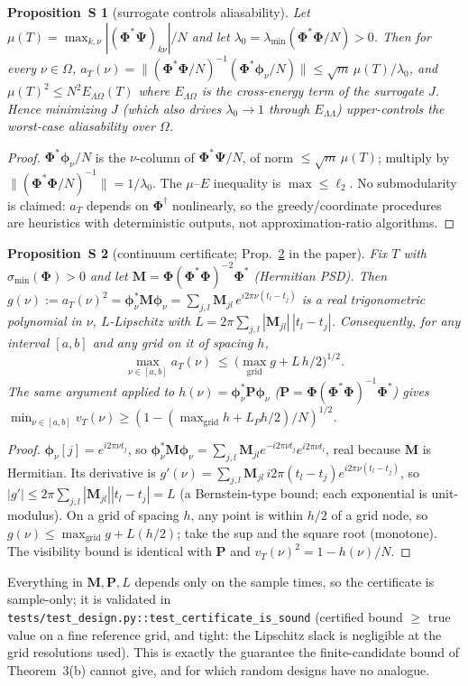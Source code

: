 \documentclass[10pt]{article}
\newtheorem{proposition}{Proposition~S}
\newcommand{\Phimat}{\bm{\Phi}}
\newcommand{\Psimat}{\bm{\Psi}}
\newcommand{\norm}[1]{\lVert#1\rVert}
\newcommand{\vt}{v_T}
\newcommand{\at}{a_T}
\begin{document}
\begin{proposition}[surrogate controls aliasability]
Let $\mu(T)=\max_{k,\nu}|(\Phimat^{*}\Psimat)_{k\nu}|/N$ and let $\lambda_0=\lambda_{\min}
(\Phimat^{*}\Phimat/N)>0$.  Then for every $\nu\in\Omega$,
$\at(\nu)=\norm{(\Phimat^{*}\Phimat/N)^{-1}(\Phimat^{*}\bm\phi_\nu/N)}\le
\sqrt m\,\mu(T)/\lambda_0$, and $\mu(T)^2\le N^2 E_{\Lambda\Omega}(T)$ where
$E_{\Lambda\Omega}$ is the cross-energy term of the surrogate $J$.  Hence minimizing $J$
(which also drives $\lambda_0\!\to\!1$ through $E_{\Lambda\Lambda}$) upper-controls the
worst-case aliasability over $\Omega$.
\end{proposition}
\begin{proof}
$\Phimat^{*}\bm\phi_\nu/N$ is the $\nu$-column of $\Phimat^{*}\Psimat/N$, of norm
$\le\sqrt m\,\mu(T)$; multiply by $\norm{(\Phimat^{*}\Phimat/N)^{-1}}=1/\lambda_0$.  The
$\mu$--$E$ inequality is $\max\le\ell_2$.  No submodularity is claimed: $\at$ depends on
$\Phimat^{\dagger}$ nonlinearly, so the greedy/coordinate procedures are heuristics with
deterministic outputs, not approximation-ratio algorithms.
\end{proof}

\begin{proposition}[continuum certificate; Prop.~\ref{prop:cert-num} in the paper]
\label{prop:cert-num}
Fix $T$ with $\sigma_{\min}(\Phimat)>0$ and let
$\bm M=\Phimat(\Phimat^{*}\Phimat)^{-2}\Phimat^{*}$ (Hermitian PSD).  Then
$g(\nu):=\at(\nu)^2=\bm\phi_\nu^{*}\bm M\bm\phi_\nu
=\sum_{j,l}\bm M_{jl}\,e^{i2\pi\nu(t_l-t_j)}$ is a real trigonometric polynomial in $\nu$,
$L$-Lipschitz with $L=2\pi\sum_{j,l}|\bm M_{jl}|\,|t_l-t_j|$.  Consequently, for any
interval $[a,b]$ and any grid on it of spacing $h$,
\[
\max_{\nu\in[a,b]}\at(\nu)\ \le\ \Big(\max_{\text{grid}} g+L\,h/2\Big)^{1/2}.
\]
The same argument applied to $h(\nu)=\bm\phi_\nu^{*}\bm P\bm\phi_\nu$
($\bm P=\Phimat(\Phimat^{*}\Phimat)^{-1}\Phimat^{*}$) gives
$\min_{\nu\in[a,b]}\vt(\nu)\ge(1-(\max_{\text{grid}}h+L_P h/2)/N)^{1/2}$.
\end{proposition}
\begin{proof}
$\bm\phi_\nu[j]=e^{i2\pi\nu t_j}$, so $\bm\phi_\nu^{*}\bm M\bm\phi_\nu=\sum_{j,l}\bm M_{jl}
e^{-i2\pi\nu t_j}e^{i2\pi\nu t_l}$, real because $\bm M$ is Hermitian.  Its derivative is
$g'(\nu)=\sum_{j,l}\bm M_{jl}\,i2\pi(t_l-t_j)e^{i2\pi\nu(t_l-t_j)}$, so
$|g'|\le2\pi\sum_{j,l}|\bm M_{jl}||t_l-t_j|=L$ (a Bernstein-type bound; each exponential is
unit-modulus).  On a grid of spacing $h$, any point is within $h/2$ of a grid node, so
$g(\nu)\le\max_{\text{grid}}g+L(h/2)$; take the sup and the square root (monotone).  The
visibility bound is identical with $\bm P$ and $\vt(\nu)^2=1-h(\nu)/N$.
\end{proof}
Everything in $\bm M,\bm P,L$ depends only on the sample times, so the certificate is
sample-only; it is validated in \texttt{tests/test\_design.py::test\_certificate\_is\_sound}
(certified bound $\ge$ true value on a fine reference grid, and tight: the Lipschitz slack
is negligible at the grid resolutions used).  This is exactly the guarantee the
finite-candidate bound of Theorem~3(b) cannot give, and for which random designs have no
analogue.
\end{document}
